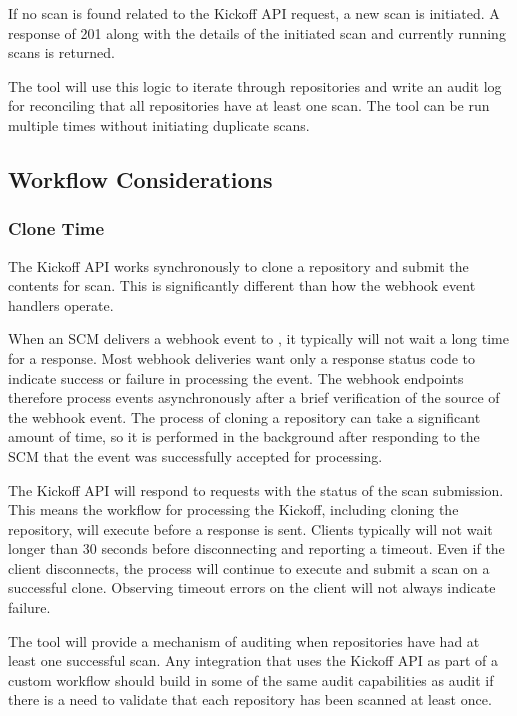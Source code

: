 If no scan is found related to the Kickoff API request, a new scan is initiated.  A response
of 201 along with the details of the initiated scan and currently running scans is returned.

The \cxoneflowaudit tool will use this logic to iterate through repositories and write an
audit log for reconciling that all repositories have at least one scan.  The \cxoneflowaudit tool
can be run multiple times without initiating duplicate scans.


\subsection{Workflow Considerations}


\subsubsection{Clone Time}

The Kickoff API works synchronously to clone a repository and submit the contents for scan.  This
is significantly different than how the webhook event handlers operate.

When an SCM delivers a webhook event to \cxoneflow, it typically will not wait a long time for a response.  Most
webhook deliveries want only a response status code to indicate success or failure in processing
the event.  The \cxoneflow webhook endpoints therefore process events asynchronously after a brief
verification of the source of the webhook event.  The process of cloning a repository can take a significant
amount of time, so it is performed in the background after responding to the SCM that the event
was successfully accepted for processing.

The Kickoff API will respond to requests with the status of the scan submission.  This means the
workflow for processing the Kickoff, including cloning the repository, will execute before
a response is sent.  Clients typically will not wait longer than 30 seconds before disconnecting
and reporting a timeout.  Even if the client disconnects, the \cxoneflow process will continue
to execute and submit a scan on a successful clone.  Observing timeout errors on the client
will not always indicate failure.  

The \cxoneflowaudit tool will provide a mechanism of auditing when repositories have had
at least one successful scan.  Any integration that uses the Kickoff API as part of a custom
workflow should build in some of the same audit capabilities as \cxoneflow audit if there is
a need to validate that each repository has been scanned at least once.


